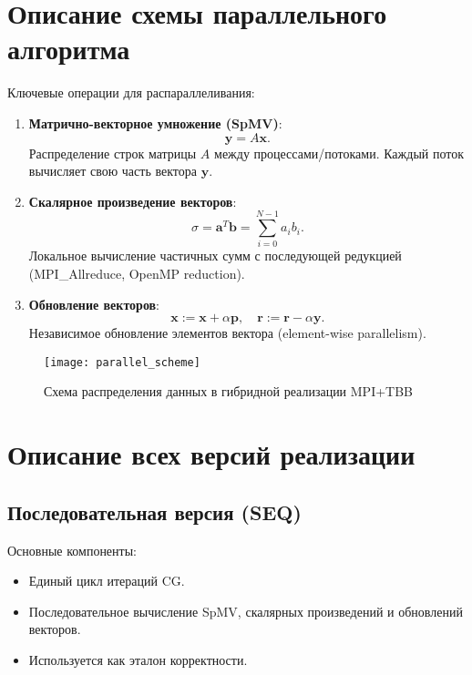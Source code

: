 \documentclass[12pt]{article}
\begin{document}
\section{Описание схемы параллельного алгоритма}

Ключевые операции для распараллеливания:
\begin{enumerate}
    \item \textbf{Матрично-векторное умножение (SpMV)}: 
    \[
    \mathbf{y} = A\mathbf{x}.
    \]
    Распределение строк матрицы \(A\) между процессами/потоками. Каждый поток вычисляет свою часть вектора \(\mathbf{y}\).
    
    \item \textbf{Скалярное произведение векторов}:
    \[
    \sigma = \mathbf{a}^T \mathbf{b} = \sum_{i=0}^{N-1} a_i b_i.
    \]
    Локальное вычисление частичных сумм с последующей редукцией (MPI\_Allreduce, OpenMP reduction).
    
    \item \textbf{Обновление векторов}:
    \[
    \mathbf{x} := \mathbf{x} + \alpha \mathbf{p}, \quad 
    \mathbf{r} := \mathbf{r} - \alpha \mathbf{y}.
    \]
    Независимое обновление элементов вектора (element-wise parallelism).
\end{enumerate}

\begin{figure}[h]
\centering
\texttt{[image: parallel\_scheme]}
\caption{Схема распределения данных в гибридной реализации MPI+TBB}
\label{fig:parallel_scheme}
\end{figure}

\section{Описание всех версий реализации}

\subsection{Последовательная версия (SEQ)}

Основные компоненты:
\begin{itemize}
    \item Единый цикл итераций CG.
    \item Последовательное вычисление SpMV, скалярных произведений и обновлений векторов.
    \item Используется как эталон корректности.
\end{itemize}
\end{document}
